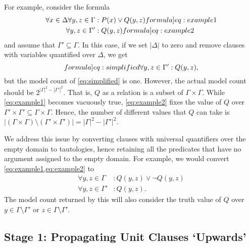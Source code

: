 \documentclass{article}
\theoremstyle{definition}
\begin{document}
For example, consider the formula
\begin{align}
  \forall x \in \Delta \forall y, z \in \Gamma &: P(x) \lor Q(y, z)\label[formula]{eq:example1}\\
  \forall y, z \in \Gamma' &: Q(y, z)\label[formula]{eq:example2}
\end{align}
and assume that $\Gamma' \subseteq \Gamma$. In this case, if we set $|\Delta|$
to zero and remove clauses with variables quantified over $\Delta$, we get
\begin{equation}\label[formula]{eq:simplified}
  \forall y, z \in \Gamma' : Q(y, z),
\end{equation}
but the model count of \cref{eq:simplified} is one. However, the actual model
count should be $2^{|\Gamma|^2 - |\Gamma'|^2}$. That is, $Q$ as a relation is a
subset of $\Gamma \times \Gamma$. While \cref{eq:example1} becomes vacuously
true, \cref{eq:example2} fixes the value of $Q$ over
$\Gamma' \times \Gamma' \subseteq \Gamma \times \Gamma$. Hence, the number of
different values that $Q$ can take is
$|(\Gamma \times \Gamma) \setminus (\Gamma' \times \Gamma')| = |\Gamma|^{2} - |\Gamma'|^{2}$.

We address this issue by converting clauses with universal quantifiers over the
empty domain to tautologies, hence retaining all the predicates that have no
argument assigned to the empty domain. For example, we would convert
\cref{eq:example1,eq:example2} to
\begin{align*}
  \forall y, z \in \Gamma &: Q(y, z) \lor \neg Q(y, z) \\
  \forall y, z \in \Gamma' &: Q(y, z).
\end{align*}
The model count returned by this will also consider the truth value of $Q$ over
$y \in \Gamma \setminus \Gamma'$ or $z \in \Gamma \setminus \Gamma'$.

\subsection{Stage 1: Propagating Unit Clauses `Upwards'}
\end{document}

